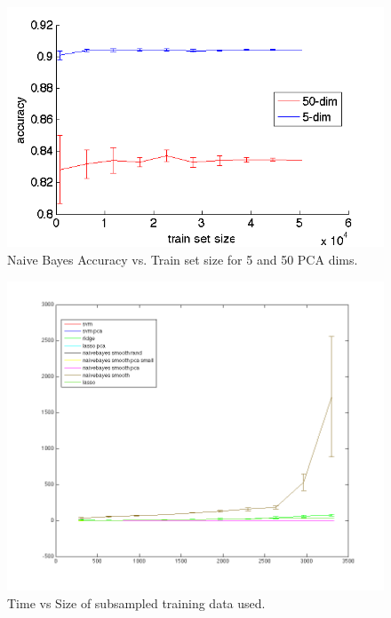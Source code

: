 
\begin{center}
\begin{figure}[!ht]
\centering
\includegraphics[width=.5\textwidth]{../images/nb_5_vs_50.png}
\caption{Naive Bayes Accuracy vs. Train set size for 5 and 50 PCA dims.}
\label{fig:5_vs_50_pca}
\end{figure}
\end{center}


\begin{center}
\begin{figure}[!ht]
\centering
\includegraphics[width=.7\textwidth]{../images/c3time.png}
\caption{Time vs Size of subsampled training data used.}
\label{fig:largecompare}
\end{figure}
\end{center}

